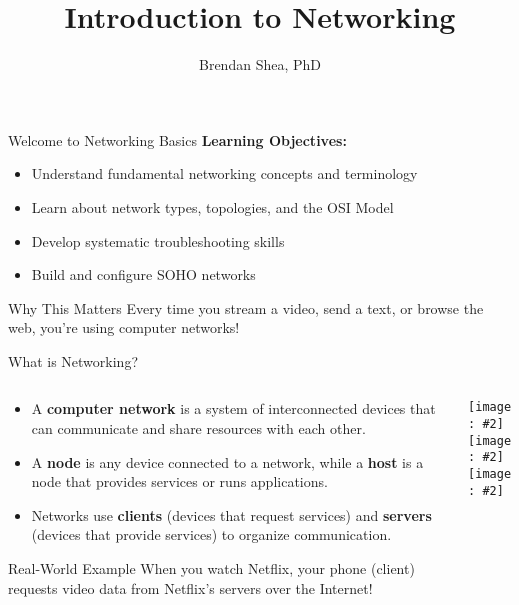 \documentclass[aspectratio=169]{beamer}
\title{Introduction to Networking}
\author{Brendan Shea, PhD}
\institute{Rochester Community and Technical College}
\date{} %
\newcommand{\neticon}[2][0.4cm]{\texttt{[image: \#2]}}
\begin{document}
\begin{frame}
\titlepage
\end{frame}

\begin{frame}{Welcome to Networking Basics}
\textbf{Learning Objectives:}
\begin{itemize}
    \item Understand fundamental networking concepts and terminology
    \item Learn about network types, topologies, and the OSI Model
    \item Develop systematic troubleshooting skills
    \item Build and configure SOHO networks
\end{itemize}

\begin{block}{Why This Matters}
Every time you stream a video, send a text, or browse the web, you're using computer networks!
\end{block}
\end{frame}

\begin{frame}{What is Networking?}
\begin{columns}
\begin{column}{0.65\textwidth}
\begin{itemize}
    \item A \textbf{computer network} is a system of interconnected devices that can communicate and share resources with each other.
    \item A \textbf{node} is any device connected to a network, while a \textbf{host} is a node that provides services or runs applications.
    \item Networks use \textbf{clients} (devices that request services) and \textbf{servers} (devices that provide services) to organize communication.
\end{itemize}

\vspace{0.3cm}
\begin{block}{Real-World Example}
When you watch Netflix, your phone (client) requests video data from Netflix's servers over the Internet!
\end{block}
\end{column}

\begin{column}{0.3\textwidth}
\centering
\neticon[1.6cm]{icon_laptop.png}\\
\vspace{0.2cm}
\neticon[1.3cm]{icon_router.png}\\
\vspace{0.2cm}
\neticon[1.6cm]{icon_server.png}
\end{column}
\end{columns}
\end{frame}
\end{document}
